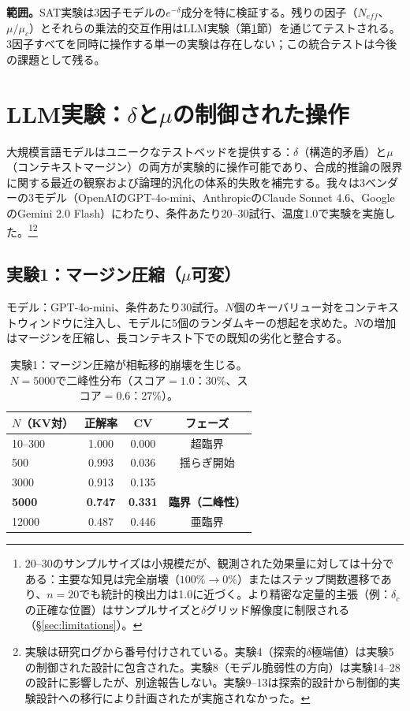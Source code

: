 \documentclass[11pt,a4paper]{article}
\begin{document}
\noindent\textbf{範囲。}SAT実験は3因子モデルの$e^{-\delta}$成分を特に検証する。残りの因子（$N_{eff}$、$\mu/\mu_c$）とそれらの乗法的交互作用はLLM実験（第\ref{sec:llm}節）を通じてテストされる。3因子すべてを同時に操作する単一の実験は存在しない；この統合テストは今後の課題として残る。

\section{LLM実験：\texorpdfstring{$\delta$}{δ}と\texorpdfstring{$\mu$}{μ}の制御された操作}
\label{sec:llm}

大規模言語モデルはユニークなテストベッドを提供する：$\delta$（構造的矛盾）と$\mu$（コンテキストマージン）の両方が実験的に操作可能であり、合成的推論の限界に関する最近の観察\cite{dziri2023,wei2022}および論理的汎化の体系的失敗\cite{berglund2023}を補完する。我々は3ベンダーの3モデル（OpenAIのGPT-4o-mini、AnthropicのClaude Sonnet 4.6、GoogleのGemini 2.0 Flash）にわたり、条件あたり20--30試行、温度1.0で実験を実施した。\footnote{20--30のサンプルサイズは小規模だが、観測された効果量に対しては十分である：主要な知見は完全崩壊（$100\% \to 0\%$）またはステップ関数遷移であり、$n = 20$でも統計的検出力は1.0に近づく。より精密な定量的主張（例：$\delta_c$の正確な位置）はサンプルサイズと$\delta$グリッド解像度に制限される（\S\ref{sec:limitations}）。}\footnote{実験は研究ログから番号付けされている。実験4（探索的$\delta$極端値）は実験5の制御された設計に包含された。実験8（モデル脆弱性の方向）は実験14--28の設計に影響したが、別途報告しない。実験9--13は探索的設計から制御的実験設計への移行により計画されたが実施されなかった。}

\subsection{実験1：マージン圧縮（\texorpdfstring{$\mu$}{μ}可変）}

モデル：GPT-4o-mini、条件あたり30試行。$N$個のキーバリュー対をコンテキストウィンドウに注入し、モデルに5個のランダムキーの想起を求めた。$N$の増加はマージンを圧縮し、長コンテキスト下での既知の劣化\cite{liu2024}と整合する。

\begin{table}[htbp]
\centering
\begin{tabular}{lccc}
\toprule
\textbf{$N$（KV対）} & \textbf{正解率} & \textbf{CV} & \textbf{フェーズ} \\
\midrule
10--300 & 1.000 & 0.000 & 超臨界 \\
500 & 0.993 & 0.036 & 揺らぎ開始 \\
3000 & 0.913 & 0.135 & \\
\textbf{5000} & \textbf{0.747} & \textbf{0.331} & \textbf{臨界（二峰性）} \\
12000 & 0.487 & 0.446 & 亜臨界 \\
\bottomrule
\end{tabular}
\caption{実験1：マージン圧縮が相転移的崩壊を生じる。$N = 5000$で二峰性分布（スコア$= 1.0$：30\%、スコア$= 0.6$：27\%）。}
\label{tab:exp1}
\end{table}
\end{document}
